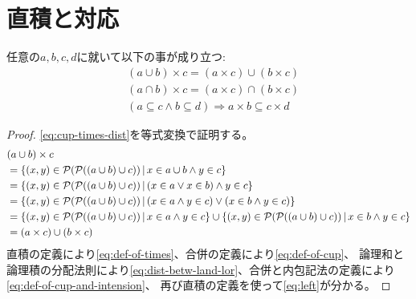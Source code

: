 \documentclass[uplatex,papersize,dvipdfmx]{jsarticle}
\begin{document}
  \section{直積と対応}
    \begin{corollary}
      任意の$a, b, c, d$に就いて以下の事が成り立つ:
      \begin{align}
        &(a \cup b) \times c = (a \times c) \cup (b \times c) \label{eq:cup-times-dist} \\
        &(a \cap b) \times c = (a \times c) \cap (b \times c) \label{eq:cap-times-dist} \\
        &(a \subseteq c \land b \subseteq d) \Rightarrow a \times b \subseteq c \times d \label{eq:times-save-subseteq}
      \end{align}
      \begin{proof}
        \eqref{eq:cup-times-dist}を等式変換で証明する。
        \begin{align}
          &(a \cup b) \times c\\
          &= \{ (x, y) \in \mathcal{P}(\mathcal{P}((a \cup b) \cup c)) \, | \, x \in a \cup b \land y \in c \} \label{eq:def-of-times}\\
          &= \{ (x, y) \in \mathcal{P}(\mathcal{P}((a \cup b) \cup c)) \, | \, (x \in a \lor x \in b) \land y \in c \} \label{eq:def-of-cup} \\
          &= \{ (x, y) \in \mathcal{P}(\mathcal{P}((a \cup b) \cup c)) \, | \, (x \in a \land y \in c) \lor (x \in b \land y \in c) \} \label{eq:dist-betw-land-lor}\\
          &= \{ (x, y) \in \mathcal{P}(\mathcal{P}((a \cup b) \cup c)) \, | \, x \in a \land y \in c \} \cup \{ (x, y) \in \mathcal{P}(\mathcal{P}((a \cup b) \cup c)) \, | \, x \in b \land y \in c \} \label{eq:def-of-cup-and-intension}\\
          &= (a \times c) \cup (b \times c)\label{eq:left}
        \end{align}
        直積の定義により\eqref{eq:def-of-times}、合併の定義により\eqref{eq:def-of-cup}、
        論理和と論理積の分配法則により\eqref{eq:dist-betw-land-lor}、合併と内包記法の定義により\eqref{eq:def-of-cup-and-intension}、
        再び直積の定義を使って\eqref{eq:left}が分かる。


\end{proof}
\end{corollary}
\end{document}
